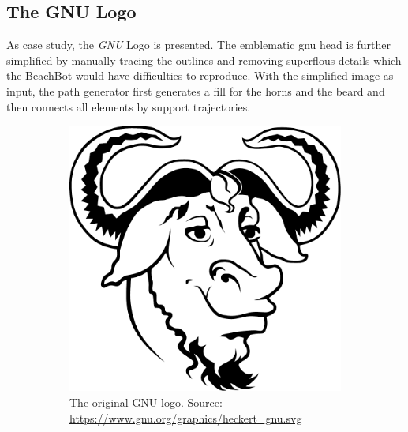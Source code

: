 \clearpage
\subsection{The GNU Logo}

As case study, the \textit{GNU} Logo is presented. The emblematic gnu head is further simplified by manually tracing the outlines and removing superflous details which the BeachBot would have difficulties to reproduce. With the simplified image as input, the path generator first generates a fill for the horns and the beard and then connects all elements by support trajectories.

\begin{figure}[h]
\centering
\begin{subfigure}[t]{0.45\textwidth}
\centering
	\includegraphics[width=\textwidth]{images/results/gnu/logo.pdf}
	\caption{The original GNU logo. Source: \url{https://www.gnu.org/graphics/heckert_gnu.svg}}
\end{subfigure}~
\begin{subfigure}[t]{0.45\textwidth}
\centering

\end{subfigure}
\end{figure}
